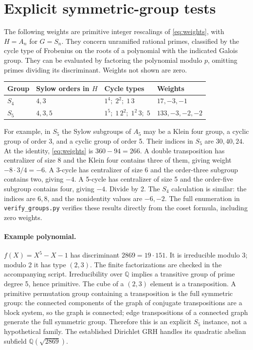 \documentclass[11pt]{article}
\theoremstyle{remark}\newtheorem{remark}[theorem]{Remark}
\newcommand{\Q}{\mathbb Q}
\begin{document}
\section{Explicit symmetric-group tests}
The following weights are primitive integer rescalings of \eqref{eq:weights}, with $H=A_n$ for $G=S_n$. They concern unramified rational primes, classified by the cycle type of Frobenius on the roots of a polynomial with the indicated Galois group. They can be evaluated by factoring the polynomial modulo $p$, omitting primes dividing its discriminant. Weights not shown are zero.
\begin{center}
\begin{tabular}{llll}
\toprule
Group & Sylow orders in $H$ & Cycle types & Weights\\
\midrule
$S_4$ & $4,3$ & $1^4;\;2^2;\;1\,3$ & $17,-3,-1$\\
$S_5$ & $4,3,5$ & $1^5;\;1\,2^2;\;1^2\,3;\;5$ & $133,-3,-2,-2$\\
\bottomrule
\end{tabular}
\end{center}
For example, in $S_5$ the Sylow subgroups of $A_5$ may be a Klein four group, a cyclic group of order 3, and a cyclic group of order 5. Their indices in $S_5$ are $30,40,24$. At the identity, \eqref{eq:weights} is $360-94=266$. A double transposition has centralizer of size 8 and the Klein four contains three of them, giving weight $-8\cdot3/4=-6$. A 3-cycle has centralizer of size 6 and the order-three subgroup contains two, giving $-4$. A 5-cycle has centralizer of size 5 and the order-five subgroup contains four, giving $-4$. Divide by 2. The $S_4$ calculation is similar: the indices are $6,8$, and the nonidentity values are $-6,-2$. The full enumeration in \texttt{verify\_groups.py} verifies these results directly from the coset formula, including zero weights.

\paragraph{Example polynomial.} $f(X)=X^5-X-1$ has discriminant $2869=19\cdot151$. It is irreducible modulo 3; modulo 2 it has type $(2,3)$. The finite factorizations are checked in the accompanying script. Irreducibility over $\Q$ implies a transitive group of prime degree 5, hence primitive. The cube of a $(2,3)$ element is a transposition. A primitive permutation group containing a transposition is the full symmetric group: the connected components of the graph of conjugate transpositions are a block system, so the graph is connected; edge transpositions of a connected graph generate the full symmetric group. Therefore this is an explicit $S_5$ instance, not a hypothetical family. The established Dirichlet GRH handles its quadratic abelian subfield $\Q(\sqrt{2869})$.
\end{document}
